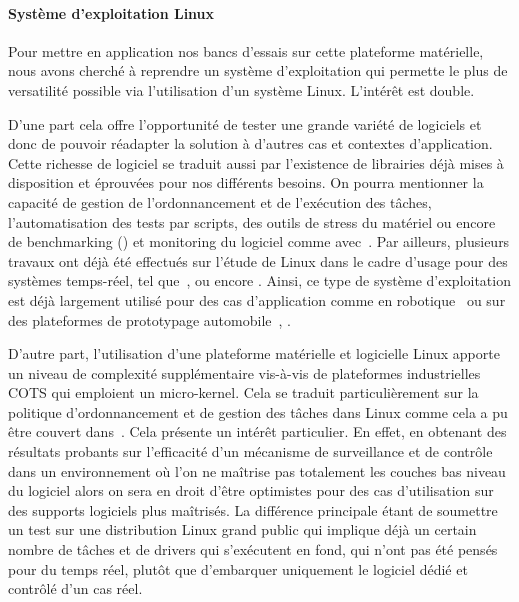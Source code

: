 \documentclass[french, a4paper, 11pt, twoside, pdftex]{StyleThese}
\begin{document}
        \paragraph{Système d'exploitation Linux}
        Pour mettre en application nos bancs d'essais sur cette plateforme matérielle, nous avons cherché à reprendre un système d'exploitation qui permette le plus de versatilité possible via l'utilisation d'un système Linux. L'intérêt est double. 
        
        D'une part cela offre l'opportunité de tester une grande variété de logiciels et donc de pouvoir réadapter la solution à d'autres cas et contextes d'application. Cette richesse de logiciel se traduit aussi par l'existence de librairies déjà mises à disposition et éprouvées pour nos différents besoins. On pourra mentionner la capacité de gestion de l'ordonnancement et de l'exécution des tâches, l'automatisation des tests par scripts, des outils de stress du matériel ou encore de benchmarking (\cite{king_stress-ng_2019}) et monitoring du logiciel comme avec~\cite{girbal_metrics_2018}. Par ailleurs, plusieurs travaux ont déjà été effectués sur l'étude de Linux dans le cadre d'usage pour des systèmes temps-réel, tel que~\cite{litayem_building_2011}, \cite{allende_towards_2019} ou encore \cite{serra_architecture_2020}. Ainsi, ce type de système d'exploitation est déjà largement utilisé pour des cas d'application comme en robotique~\cite{bouchier_embedded_2013} ou sur des plateformes de prototypage automobile~\cite{sivakumar_automotive_2020}, \cite{gobillot_esprit_2018}.
        
        D'autre part, l'utilisation d'une plateforme matérielle et logicielle Linux apporte un niveau de complexité supplémentaire vis-à-vis de plateformes industrielles COTS qui emploient un micro-kernel. Cela se traduit particulièrement sur la politique d'ordonnancement et de gestion des tâches dans Linux comme cela a pu être couvert dans~\cite{lozi_linux_2016}. Cela présente un intérêt particulier. En effet, en obtenant des résultats probants sur l'efficacité d'un mécanisme de surveillance et de contrôle dans un environnement où l'on ne maîtrise pas totalement les couches bas niveau du logiciel alors on sera en droit d'être optimistes pour des cas d'utilisation sur des supports logiciels plus maîtrisés. La différence principale étant de soumettre un test sur une distribution Linux grand public qui implique déjà un certain nombre de tâches et de drivers qui s'exécutent en fond, qui n'ont pas été pensés pour du temps réel, plutôt que d'embarquer uniquement le logiciel dédié et contrôlé d'un cas réel.
        
\end{document}
